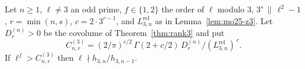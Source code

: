 Let $n\ge1$, $\ell\ne3$ an odd prime, $f\in\{1,2\}$ the order of $\ell$ modulo $3$, $3^{s}\,\|\,\ell^{2}-1$, $r=\min(n,s)$, $c=2\cdot3^{r-1}$, and $L^{\mathrm{rel}}_{3,n}$ as in Lemma~\ref{lem:mo25-z3}. Let $D_r^{(n)}>0$ be the covolume of Theorem~\ref{thm:rank3} and put
\[ C^{(3)}_{n,r}=(2/\pi)^{c/2}\,\Gamma(2+c/2)\,D_r^{(n)}\big/(L^{\mathrm{rel}}_{3,n})^{\,c} . \]
If $\ell^{f}>C^{(3)}_{n,r}$ then $\ell\nmid h_{3,n}/h_{3,n-1}$.

